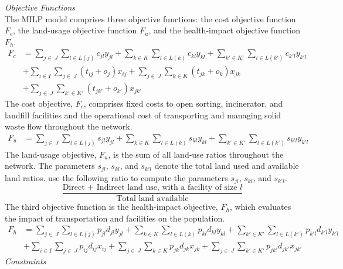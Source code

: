 \documentclass[mscthesis, 11pt]{usiinfthesis}
\theoremstyle{newdefinition}
\begin{document}
\textit{Objective Functions}
\\
The MILP model comprises three objective functions: the cost objective function $F_c$, the land-usage objective function $F_u$, and the health-impact objective function $F_h$.
\begin{equation}\label{Fc}
    \begin{aligned}
        F_c &= \sum_{j \in \: J} \sum_{l \in L(j)} c_{jl} y_{jl} + \sum_{k \in K} \sum_{l \in L(k)} c_{kl} y_{kl} + \sum_{k' \in K'} \sum_{l \in L(k')} c_{k'l} y_{k'l} 
        \\ &+ \sum_{i \in I} \sum_{j \in \: J} (t_{ij} + o_{j}) x_{ij} + \sum_{j \in \: J} \sum_{k \in K} (t_{jk} + o_{k}) x_{jk} \\ &+ \sum_{j \in \: J} \sum_{k' \in K'} (t_{jk'} + o_{k'}) x_{jk'}
    \end{aligned}
\end{equation}
The cost objective, $F_c$, comprises fixed costs to open sorting, incinerator, and landfill facilities and the operational cost of transporting and managing solid waste flow throughout the network.
\begin{equation}\label{Fu}
    \begin{aligned}
        F_u &= \sum_{j \in \: J} \sum_{l \in L(j)} s_{jl} y_{jl} + \sum_{k \in K} \sum_{l \in L(k)} s_{kl} y_{kl} + \sum_{k' \in K'} \sum_{l \in L(k')} s_{k'l} y_{k'l} 
    \end{aligned}
\end{equation}
The land-usage objective, $F_u$, is the sum of all land-use ratios throughout the network. The parameters $s_{jl}$, $s_{kl}$, and $s_{k'l}$ denote the total land used and available land ratios.
\cite[~p.~7]{olapiriyakul_multiobjective_2019} use the following ratio to compute the parameters $s_{jl}$, $s_{kl}$, and $s_{k'l}$.
\begin{equation}\label{ratio}
    \frac{\text{Direct + Indirect land use, with a facility of size } l}{\text{Total land available}}
\end{equation}
The third objective function is the health-impact objective, $F_h$, which evaluates the impact of transportation and facilities on the population.
\begin{equation}\label{Fh}
    \begin{aligned}
        F_h &= \sum_{j \in \: J} \sum_{l \in L(j)} p_{jl} d_{jl} y_{jl} + \sum_{k \in K} \sum_{l \in L(k)} p_{kl} d_{kl} y_{kl} + \sum_{k' \in K'} \sum_{l \in L(k')} p_{k'l} d_{k'l} y_{k'l} 
        \\ &+ \sum_{i \in I} \sum_{j \in \: J} p_{ij} d_{ij} x_{ij} + \sum_{j \in \: J} \sum_{k \in K} p_{jk} d_{jk} x_{jk} + \sum_{j \in \: J} \sum_{k' \in K'} p_{jk'} d_{jk'} x_{jk'}
    \end{aligned}
\end{equation}
\textit{Constraints}
\end{document}
